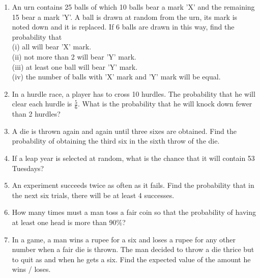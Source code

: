 \begin{enumerate}[label=\arabic*.,ref=\thesubsection.\theenumi]
\item An urn contains 25 balls of which 10 balls bear a mark 'X' and the remaining 15 bear a mark 'Y'. A ball is drawn at random from the urn, its mark is noted down and it is replaced. If 6 balls are drawn in this way, find the probability that\\
(i) all will bear 'X' mark.\\
(ii) not more than 2 will bear 'Y' mark.\\
(iii) at least one ball will bear 'Y' mark.\\
(iv) the number of balls with 'X' mark and 'Y' mark will be equal.\\

\item In a hurdle race, a player has to cross 10 hurdles. The probability that he will
clear each hurdle is $\frac{5}{6}$. What is the probability that he will knock down fewer than 2 hurdles?\\

\item A die is thrown again and again until three sixes are obtained. Find the probability of obtaining the third six in the sixth throw of the die.\\

\item If a leap year is selected at random, what is the chance that it will contain 53
Tuesdays?\\

\item An experiment succeeds twice as often as it fails. Find the probability that in the next six trials, there will be at least 4 successes.\\

\item How many times must a man toss a fair coin so that the probability of having at least one head is more than 90$\%$?\\

\item In a game, a man wins a rupee for a six and loses a rupee for any other number when a fair die is thrown. The man decided to throw a die thrice but to quit as and when he gets a six. Find the expected value of the amount he wins / loses.\\


\end{enumerate}
